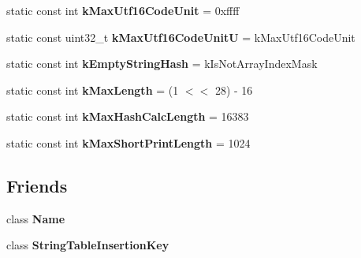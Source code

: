 \begin{DoxyCompactItemize}
\item 
\hypertarget{classv8_1_1internal_1_1_string_a9719cdc31445a57dce92e4d4805b08bf}{}static const int {\bfseries k\+Max\+Utf16\+Code\+Unit} = 0xffff\label{classv8_1_1internal_1_1_string_a9719cdc31445a57dce92e4d4805b08bf}

\item 
\hypertarget{classv8_1_1internal_1_1_string_a81ef90e12316d65782d437f8dca8b1d5}{}static const uint32\+\_\+t {\bfseries k\+Max\+Utf16\+Code\+Unit\+U} = k\+Max\+Utf16\+Code\+Unit\label{classv8_1_1internal_1_1_string_a81ef90e12316d65782d437f8dca8b1d5}

\item 
\hypertarget{classv8_1_1internal_1_1_string_a3b864db10349d91eee50443b59f06ea9}{}static const int {\bfseries k\+Empty\+String\+Hash} = k\+Is\+Not\+Array\+Index\+Mask\label{classv8_1_1internal_1_1_string_a3b864db10349d91eee50443b59f06ea9}

\item 
\hypertarget{classv8_1_1internal_1_1_string_a52630f40be32d591ee88ec7670dd45d5}{}static const int {\bfseries k\+Max\+Length} = (1 $<$$<$ 28) -\/ 16\label{classv8_1_1internal_1_1_string_a52630f40be32d591ee88ec7670dd45d5}

\item 
\hypertarget{classv8_1_1internal_1_1_string_a51b6ca2dcf6d8bdb10c510d580e0e3f4}{}static const int {\bfseries k\+Max\+Hash\+Calc\+Length} = 16383\label{classv8_1_1internal_1_1_string_a51b6ca2dcf6d8bdb10c510d580e0e3f4}

\item 
\hypertarget{classv8_1_1internal_1_1_string_a615a212c4e682f2aef5f3c45faaba643}{}static const int {\bfseries k\+Max\+Short\+Print\+Length} = 1024\label{classv8_1_1internal_1_1_string_a615a212c4e682f2aef5f3c45faaba643}

\end{DoxyCompactItemize}
\subsection*{Friends}
\begin{DoxyCompactItemize}
\item 
\hypertarget{classv8_1_1internal_1_1_string_aa5584a36f0e4c358cedb1416f5429051}{}class {\bfseries Name}\label{classv8_1_1internal_1_1_string_aa5584a36f0e4c358cedb1416f5429051}

\item 
\hypertarget{classv8_1_1internal_1_1_string_a1fbe4fdc255e8e29ccb2f71a44347fce}{}class {\bfseries String\+Table\+Insertion\+Key}\label{classv8_1_1internal_1_1_string_a1fbe4fdc255e8e29ccb2f71a44347fce}

\end{DoxyCompactItemize}
